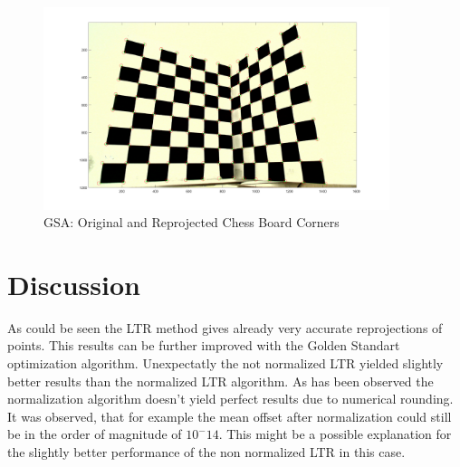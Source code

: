 \documentclass[12pt]{article}
\begin{document}
\begin{figure}[ht]
	\centering
	\includegraphics[width=0.9\textwidth]{gold.png}
	\caption{GSA: Original and Reprojected Chess Board Corners}
	\label{fig1}
\end{figure}

\section{Discussion}
As could be seen the LTR method gives already very accurate reprojections of points. This results can be further improved with the Golden Standart optimization algorithm. 
\vspace{5mm}
\newline
Unexpectatly the not normalized LTR yielded slightly better results than the normalized LTR algorithm. As has been observed the normalization algorithm doesn't yield perfect results due to numerical rounding. It was observed, that for example the mean offset after normalization could still be in the order of magnitude of $10^-14$. This might be a possible explanation for the slightly better performance of the non normalized LTR in this case.
\end{document}
